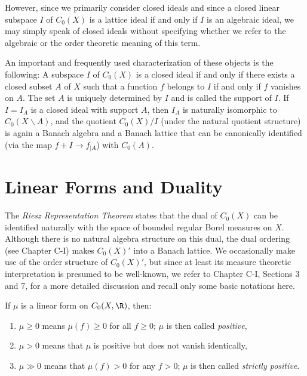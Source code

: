 However, since we primarily consider closed ideals and since a closed linear subspace $I$ of $C_{0}(X)$ is a lattice ideal if and only if $I$ is an algebraic ideal, we may simply speak of closed ideals without specifying whether we refer to the algebraic or the order theoretic meaning of this term.

An important and frequently used characterization of these objects is the following: A subspace $I$ of $C_{0}(X)$ is a closed ideal if and only if there exists a closed subset $A$ of $X$ such that a function $f$ belongs to $I$ if and only if $f$ vanishes on $A$.
The set $A$ is uniquely determined by $I$ and is called the support of $I$.
If $I = I_{A}$ is a closed ideal with support $A$, then $I_{A}$ is naturally isomorphic to $C_{0}(X\backslash A)$, and the quotient $C_{0}(X)/I$ (under the natural quotient structure) is again a Banach algebra and a Banach lattice that can be canonically identified (via the map $f + I \to f_{|A}$) with $C_{0}(A)$.

\section{Linear Forms and Duality}\label{sec:b1-2}

The \emph{Riesz Representation Theorem} states that the dual of $C_{0}(X)$ can be identified naturally with the space of bounded regular Borel measures on $X$.
Although there is no natural algebra structure on this dual, the dual ordering (see Chapter C-I) makes $C_{0}(X)'$ into a Banach lattice.
We occasionally make use of the order structure of $C_{0}(X)'$, but since at least its measure theoretic interpretation is presumed to be well-known, we refer to Chapter C-I, Sections 3 and 7, for a more detailed discussion and recall only some basic notations here.

\noindent If $\mu$ is a linear form on $C_{0}(X,\R)$, then:

\begin{enumerate}[label=]
\item
$\mu \geq 0$ means $\mu(f) \geq 0$ for all $f \geq 0$; $\mu$ is then called \emph{positive},

\item
$\mu > 0$ means that $\mu$ is positive but does not vanish identically,

\item
$\mu \gg 0$ means that $\mu(f) > 0$ for any $f > 0$; $\mu$ is then called \emph{strictly positive}.
\end{enumerate}

